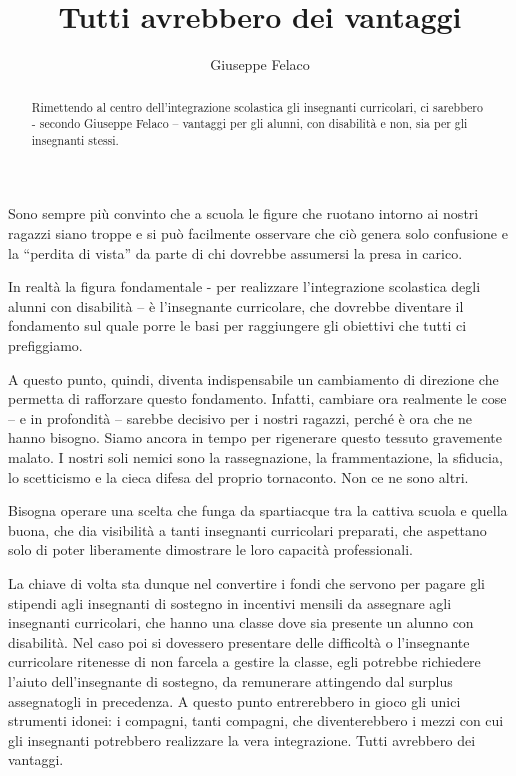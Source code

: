 \author{Giuseppe Felaco}
\title{Tutti avrebbero dei vantaggi}
\label{cha:felaco260413}
\begin{abstract}
Rimettendo al centro dell'integrazione scolastica gli insegnanti curricolari, ci sarebbero - secondo Giuseppe Felaco -- vantaggi per gli alunni, con disabilità e non, sia per gli insegnanti stessi. 
\end{abstract}
\maketitle
{}
Sono sempre più convinto che a scuola le figure che ruotano intorno ai nostri ragazzi siano troppe e si può facilmente osservare che ciò genera solo confusione e la “perdita di vista” da parte di chi dovrebbe assumersi la presa in carico.

In realtà la figura fondamentale - per realizzare l'integrazione scolastica degli alunni con disabilità – è l'insegnante curricolare, che dovrebbe diventare il fondamento sul quale porre le basi per raggiungere gli obiettivi che tutti ci prefiggiamo.

A questo punto, quindi, diventa indispensabile un cambiamento di direzione che permetta di rafforzare questo fondamento. Infatti, cambiare ora realmente le cose – e in profondità – sarebbe decisivo per i nostri ragazzi, perché è ora che ne hanno bisogno. Siamo ancora in tempo per rigenerare questo tessuto gravemente malato. I nostri soli nemici sono la rassegnazione, la frammentazione, la sfiducia, lo scetticismo e la cieca difesa del proprio tornaconto. Non ce ne sono altri.

Bisogna operare una scelta che funga da spartiacque tra la cattiva scuola e quella buona, che dia visibilità a tanti insegnanti curricolari preparati, che aspettano solo di poter liberamente dimostrare le loro capacità professionali.

La chiave di volta sta dunque nel convertire i fondi che servono per pagare gli stipendi agli insegnanti di sostegno in incentivi mensili da assegnare agli insegnanti curricolari, che hanno una classe dove sia presente un alunno con disabilità. Nel caso poi si dovessero presentare delle difficoltà o l'insegnante curricolare ritenesse di non farcela a gestire la classe, egli potrebbe richiedere l'aiuto dell'insegnante di sostegno, da remunerare attingendo dal surplus assegnatogli in precedenza. A questo punto entrerebbero in gioco gli unici strumenti idonei: i compagni, tanti compagni, che diventerebbero i mezzi con cui gli insegnanti potrebbero realizzare la vera integrazione.
Tutti avrebbero dei vantaggi.

